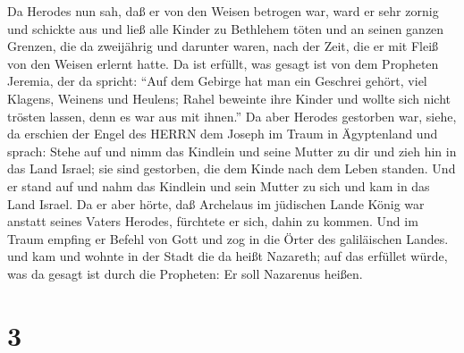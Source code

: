  Da Herodes nun sah, daß er von den Weisen betrogen war,
ward er sehr zornig und schickte aus und ließ alle Kinder zu Bethlehem
töten und an seinen ganzen Grenzen, die da zweijährig und darunter
waren, nach der Zeit, die er mit Fleiß von den Weisen erlernt hatte.
 Da ist erfüllt, was gesagt ist von dem Propheten Jeremia,
der da spricht:  ``Auf dem Gebirge hat man ein Geschrei
gehört, viel Klagens, Weinens und Heulens; Rahel beweinte ihre Kinder
und wollte sich nicht trösten lassen, denn es war aus mit ihnen.''
 Da aber Herodes gestorben war, siehe, da erschien der
Engel des HERRN dem Joseph im Traum in Ägyptenland  und
sprach: Stehe auf und nimm das Kindlein und seine Mutter zu dir und zieh
hin in das Land Israel; sie sind gestorben, die dem Kinde nach dem Leben
standen.  Und er stand auf und nahm das Kindlein und sein
Mutter zu sich und kam in das Land Israel.  Da er aber
hörte, daß Archelaus im jüdischen Lande König war anstatt seines Vaters
Herodes, fürchtete er sich, dahin zu kommen. Und im Traum empfing er
Befehl von Gott und zog in die Örter des galiläischen Landes.
 und kam und wohnte in der Stadt die da heißt Nazareth; auf
das erfüllet würde, was da gesagt ist durch die Propheten: Er soll
Nazarenus heißen.

\hypertarget{section-2}{%
\section{3}\label{section-2}}

